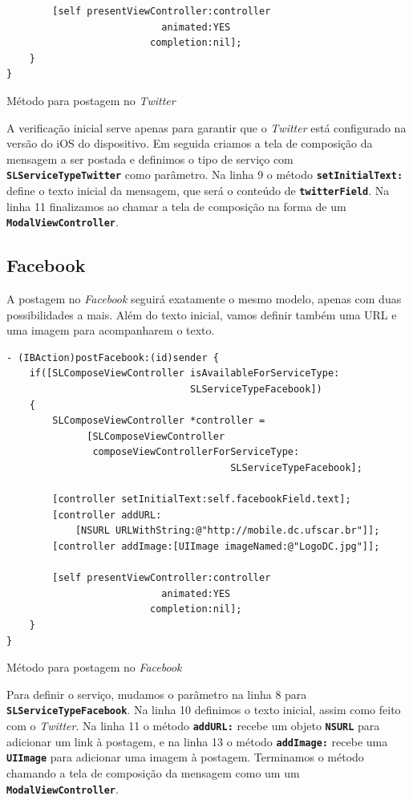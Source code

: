 \documentclass[a4paper,12pt,brazil,doubleside]{book}
\begin{document}
\begin{singlespace}
\begin{listing}[H]
\begin{verbatim}
        [self presentViewController:controller
                           animated:YES
                         completion:nil];
    }
}
\end{verbatim}
\caption{Método para postagem no \emph{Twitter}}
\end{listing}


A verificação inicial serve apenas para garantir que o \emph{Twitter} está configurado na versão do iOS do dispositivo. Em seguida criamos a tela de composição da mensagem a ser postada e definimos o tipo de serviço com \texttt{\textbf{SLServiceTypeTwitter}} como parâmetro. Na linha 9 o método \texttt{\textbf{setInitialText:}} define o texto inicial da mensagem, que será o conteúdo de \texttt{\textbf{twitterField}}. Na linha 11 finalizamos ao chamar a tela de composição na forma de um \texttt{\textbf{ModalViewController}}.

\subsection{Facebook}


A postagem no \emph{Facebook} seguirá exatamente o mesmo modelo, apenas com duas possibilidades a mais. Além do texto inicial, vamos definir também uma URL e uma imagem para acompanharem o texto.

\begin{listing}[H]
\begin{verbatim}
- (IBAction)postFacebook:(id)sender {
    if([SLComposeViewController isAvailableForServiceType:
                                SLServiceTypeFacebook])
    {
        SLComposeViewController *controller =
              [SLComposeViewController
               composeViewControllerForServiceType:
                                       SLServiceTypeFacebook];
        
        [controller setInitialText:self.facebookField.text];
        [controller addURL:
            [NSURL URLWithString:@"http://mobile.dc.ufscar.br"]];
        [controller addImage:[UIImage imageNamed:@"LogoDC.jpg"]];

        [self presentViewController:controller
                           animated:YES
                         completion:nil];
    }
}
\end{verbatim}
\caption{Método para postagem no \emph{Facebook}}
\end{listing}


Para definir o serviço, mudamos o parâmetro na linha 8 para \texttt{\textbf{SLServiceTypeFacebook}}. Na linha 10 definimos o texto inicial, assim como feito com o \emph{Twitter}. Na linha 11 o método \texttt{\textbf{addURL:}} recebe um objeto \texttt{\textbf{NSURL}} para adicionar um link à postagem, e na linha 13 o método \texttt{\textbf{addImage:}} recebe uma \texttt{\textbf{UIImage}} para adicionar uma imagem à postagem. Terminamos o método chamando a tela de composição da mensagem como um um \texttt{\textbf{ModalViewController}}.


\end{singlespace}
\end{document}
